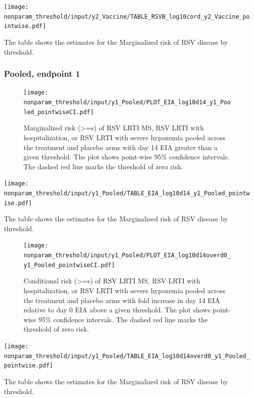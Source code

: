 \documentclass[11pt]{article}
\begin{document}
\begin{table}[H]
    \centering
    \texttt{[image: nonparam\_threshold/input/y2\_Vaccine/TABLE\_RSVB\_log10cord\_y2\_Vaccine\_pointwise.pdf]}
    \caption{The table shows the  estimates for the Marginalized risk of RSV disease by threshold. }
\end{table}

\hypertarget{pooled-endpoint-1}{%
\subsubsection{Pooled, endpoint 1}\label{pooled-endpoint-1}}

\begin{figure}[H]
\centering
\texttt{[image: nonparam\_threshold/input/y1\_Pooled/PLOT\_EIA\_log10d14\_y1\_Pooled\_pointwiseCI.pdf]}
\caption{Marginalized risk (>=s) of RSV LRTI MS, RSV LRTI with hospitalization, or RSV LRTI with severe hypoxemia pooled across the treatment and placebo arms with day 14 EIA greater than a given threshold. The plot shows point-wise 95\% confidence intervals. The dashed red line marks the threshold of zero risk.}
\end{figure}

\begin{table}[H]
\centering
\texttt{[image: nonparam\_threshold/input/y1\_Pooled/TABLE\_EIA\_log10d14\_y1\_Pooled\_pointwise.pdf]}
\caption{The table shows the  estimates for the Marginalized risk of RSV disease by threshold. }
\end{table}

\begin{figure}[H]
\centering
\texttt{[image: nonparam\_threshold/input/y1\_Pooled/PLOT\_EIA\_log10d14overd0\_y1\_Pooled\_pointwiseCI.pdf]}
\caption{Conditional risk (>=s) of RSV LRTI MS, RSV LRTI with hospitalization, or RSV LRTI with severe hypoxemia pooled across the treatment and placebo arms with fold increase in day 14 EIA relative to day 0 EIA above a given threshold. The plot shows point-wise 95\% confidence intervals. The dashed red line marks the threshold of zero risk.}
\end{figure}

\begin{table}[H]
\centering
\texttt{[image: nonparam\_threshold/input/y1\_Pooled/TABLE\_EIA\_log10d14overd0\_y1\_Pooled\_pointwise.pdf]}
\caption{The table shows the  estimates for the Marginalized risk of RSV disease by threshold. }
\end{table}
\end{document}
